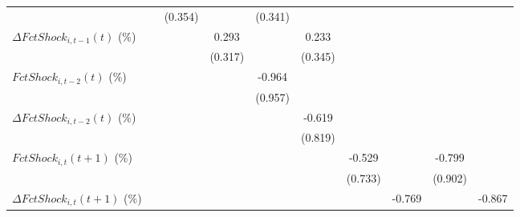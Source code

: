 {\begin{tabular}{l*{9}{c}}
                    &                     &     (0.354)         &                     &     (0.341)         &                     &                     &                     &                     &                     \\
\addlinespace
$ \Delta FctShock_{i,t-1}(t)$ (\%)&                     &                     &       0.293         &                     &       0.233         &                     &                     &                     &                     \\
                    &                     &                     &     (0.317)         &                     &     (0.345)         &                     &                     &                     &                     \\
\addlinespace
$ FctShock_{i,t-2}(t)$ (\%)&                     &                     &                     &      -0.964         &                     &                     &                     &                     &                     \\
                    &                     &                     &                     &     (0.957)         &                     &                     &                     &                     &                     \\
\addlinespace
$ \Delta FctShock_{i,t-2}(t)$ (\%)&                     &                     &                     &                     &      -0.619         &                     &                     &                     &                     \\
                    &                     &                     &                     &                     &     (0.819)         &                     &                     &                     &                     \\
\addlinespace
$ FctShock_{i,t}(t+1)$ (\%)&                     &                     &                     &                     &                     &      -0.529         &                     &      -0.799         &                     \\
                    &                     &                     &                     &                     &                     &     (0.733)         &                     &     (0.902)         &                     \\
\addlinespace
$ \Delta FctShock_{i,t}(t+1)$ (\%)&                     &                     &                     &                     &                     &                     &      -0.769         &                     &      -0.867         \\

\end{tabular}}
